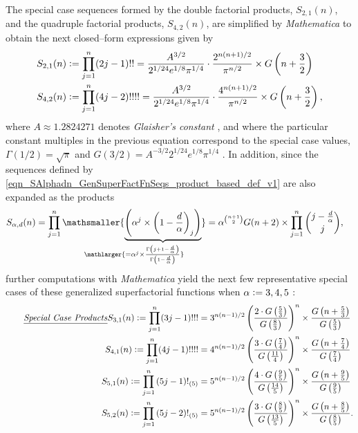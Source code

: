 \documentclass[12pt,reqno]{article}
\numberwithin{sfootnote}{section}
\numberwithin{equation}{section}
\newcommand{\tagtext}[1]{\tag*{\underline{\textit{#1}}}}
\theoremstyle{plain}
\theoremstyle{definition}
\theoremstyle{remark}
\newcommand{\cf}[0]{cf.\ }
\newcommand{\defequals}{\ensuremath{\vcentcolon=}}
\newcommand{\undersetbrace}[2]{\ensuremath{\underset{\mathlarger{#1}}{\mathsmaller{\underbrace{#2}}}}}
\newcommand{\Mm}[0]{\emph{Mathematica}}
\newcommand{\Pochhammer}[2]{\ensuremath{\left(#1\right)_{#2}}}
\newcommand{\AlphaFactorial}[2]{\ensuremath{\left(#1\right)!_{\left(#2\right)}}}
\begin{document}
The special case sequences formed by the double factorial products, 
$S_{2,1}(n)$, and the quadruple factorial products, $S_{4,2}(n)$, 
are simplified by \Mm{} to obtain the next 
closed--form expressions given by 
\begin{align*} 
S_{2,1}(n) & \defequals \prod_{j=1}^{n} (2j-1)!! = 
     \frac{A^{3/2}}{2^{1/24} e^{1/8} \pi^{1/4}} \cdot 
     \frac{2^{n(n+1)/2}}{\pi^{n/2}} \times 
     G\left(n + \frac{3}{2}\right) \\ 
S_{4,2}(n) & \defequals \prod_{j=1}^{n} (4j-2)!!!! = 
     \frac{A^{3/2}}{2^{1/24} e^{1/8} \pi^{1/4}} \cdot 
     \frac{4^{n(n+1)/2}}{\pi^{n/2}} \times 
     G\left(n + \frac{3}{2}\right), 
\end{align*} 
where $A \approx 1.2824271$ denotes \emph{Glaisher's constant} 
\citep[\S 5.17]{NISTHB}, and where the particular constant multiples 
in the previous equation correspond to the special case values, 
$\Gamma(1/2) = \sqrt{\pi}$ and 
$G(3/2) = A^{-3/2} 2^{1/24} e^{1/8} \pi^{1/4}$ 
\citep{CONTRIB-THEORY-BARNESGFN}. 
In addition, 
since the sequences defined by 
\eqref{eqn_SAlphadn_GenSuperFactFnSeqs_product_based_def_v1} 
are also expanded as the products 
\begin{align*} 
S_{\alpha,d}(n) & = 
     \prod_{j=1}^{n} 
     \undersetbrace{= \alpha^{j} \times 
     \frac{\Gamma\left(j+1-\frac{d}{\alpha}\right)}{ 
     \Gamma\left(1-\frac{d}{\alpha}\right)}}{
     \left( 
     \alpha^{j} \times \Pochhammer{1 - \frac{d}{\alpha}}{j} 
     \right) 
     } = 
     \alpha^{\binom{n+1}{2}} G(n+2) \times 
     \prod_{j=1}^{n} \binom{j-\frac{d}{\alpha}}{j}, 
\end{align*} 
further computations with \Mm{} yield the next 
few representative special cases of these generalized superfactorial 
functions when $\alpha \defequals 3, 4, 5$
\citep[\cf \S 2]{CONTRIB-THEORY-BARNESGFN}: 
\begin{align*} 
\tagtext{Special Case Products} 
S_{3,1}(n) \defequals 
     \prod_{j=1}^{n} (3j-1)!!! & = 
     3^{n(n-1)/2} \left( \frac{2 \cdot G\left(\frac{5}{3}\right)}{ 
     G\left(\frac{8}{3}\right)}\right)^{n} 
     \times \frac{G\left(n+\frac{5}{3}\right)}{G\left(\frac{5}{3}\right)} \\ 
S_{4,1}(n) \defequals  
\prod_{j=1}^{n} (4j-1)!!!! & = 
     4^{n(n-1)/2} \left( \frac{3 \cdot G\left(\frac{7}{4}\right)}{ 
     G\left(\frac{11}{4}\right)}\right)^{n} 
     \times \frac{G\left(n+\frac{7}{4}\right)}{G\left(\frac{7}{4}\right)} \\ 
S_{5,1}(n) \defequals 
\prod_{j=1}^{n} \AlphaFactorial{5j-1}{5} & = 
     5^{n(n-1)/2} \left( \frac{4 \cdot G\left(\frac{9}{5}\right)}{ 
     G\left(\frac{14}{5}\right)}\right)^{n} 
     \times \frac{G\left(n+\frac{9}{5}\right)}{G\left(\frac{9}{5}\right)} \\ 
S_{5,2}(n) \defequals 
\prod_{j=1}^{n} \AlphaFactorial{5j-2}{5} & = 
     5^{n(n-1)/2} \left( \frac{3 \cdot G\left(\frac{8}{5}\right)}{ 
     G\left(\frac{13}{5}\right)}\right)^{n} 
     \times \frac{G\left(n+\frac{8}{5}\right)}{G\left(\frac{8}{5}\right)}. 
\end{align*} 
\end{document}
